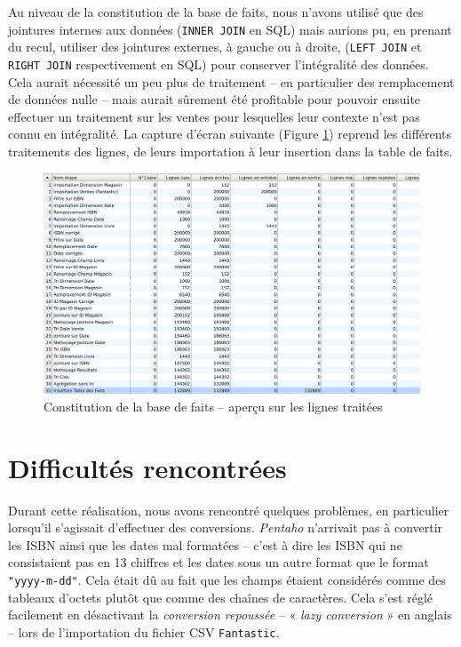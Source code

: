 	Au niveau de la constitution de la base de faits, nous n'avons utilisé que des jointures internes aux données (\texttt{INNER JOIN} en SQL) mais aurions pu, en prenant du recul, utiliser des jointures externes, à gauche ou à droite, (\texttt{LEFT JOIN} et \texttt{RIGHT JOIN} respectivement en SQL) pour conserver l'intégralité des données. Cela aurait nécessité un peu plus de traitement -- en particulier des remplacement de données nulle -- mais aurait sûrement été profitable pour pouvoir ensuite effectuer un traitement sur les ventes pour lesquelles leur contexte n'est pas connu en intégralité. La capture d'écran suivante (Figure \ref{traitementFaits}) reprend les différents traitements des lignes, de leurs importation à leur insertion dans la table de faits.
	
	\begin{figure}[H]
      \centerline{\includegraphics[width=\textwidth]{../TD2/screenshots/screenInsertionFaits.png}}
      \caption{Constitution de la base de faits -- aperçu sur les lignes traitées}
      \label{traitementFaits}
  	\end{figure}

\section{Difficultés rencontrées}

	Durant cette réalisation, nous avons rencontré quelques problèmes, en particulier lorsqu'il s'agissait d'effectuer des conversions. \textit{Pentaho} n'arrivait pas à convertir les ISBN ainsi que les dates mal formatées -- c'est à dire les ISBN qui ne consistaient pas en 13 chiffres et les dates sous un autre format que le format \texttt{"yyyy-m-dd"}. Cela était dû au fait que les champs étaient considérés comme des tableaux d'octets plutôt que comme des chaînes de caractères. Cela s'est réglé facilement en désactivant la \textit{conversion repoussée} -- « \textit{lazy conversion} » en anglais -- lors de l'importation du fichier CSV \texttt{Fantastic}.\\
	
